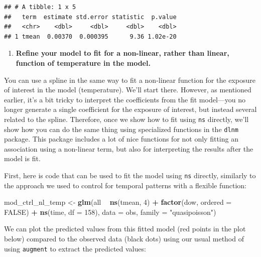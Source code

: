 \documentclass[
]{book}
\newenvironment{Shaded}{\begin{snugshade}}{\end{snugshade}}
\newcommand{\DataTypeTok}[1]{\textcolor[rgb]{0.13,0.29,0.53}{#1}}
\newcommand{\DecValTok}[1]{\textcolor[rgb]{0.00,0.00,0.81}{#1}}
\newcommand{\KeywordTok}[1]{\textcolor[rgb]{0.13,0.29,0.53}{\textbf{#1}}}
\newcommand{\NormalTok}[1]{#1}
\newcommand{\OperatorTok}[1]{\textcolor[rgb]{0.81,0.36,0.00}{\textbf{#1}}}
\newcommand{\OtherTok}[1]{\textcolor[rgb]{0.56,0.35,0.01}{#1}}
\newcommand{\StringTok}[1]{\textcolor[rgb]{0.31,0.60,0.02}{#1}}
\providecommand{\tightlist}{%
  \setlength{\itemsep}{0pt}\setlength{\parskip}{0pt}}
\begin{document}
\begin{verbatim}
## # A tibble: 1 x 5
##   term  estimate std.error statistic  p.value
##   <chr>    <dbl>     <dbl>     <dbl>    <dbl>
## 1 tmean  0.00370  0.000395      9.36 1.02e-20
\end{verbatim}

\begin{enumerate}
\def\labelenumi{\arabic{enumi}.}
\setcounter{enumi}{2}
\tightlist
\item
  \textbf{Refine your model to fit for a non-linear, rather than linear, function
  of temperature in the model.}
\end{enumerate}

You can use a spline in the same way to fit a non-linear function for the
exposure of interest in the model (temperature). We'll start there. However,
as mentioned earlier, it's a bit tricky to interpret the coefficients from the
fit model---you no longer generate a single coefficient for the exposure of
interest, but instead several related to the spline. Therefore, once we show
how to fit using \texttt{ns} directly, we'll show how you can do the same thing using
specialized functions in the \texttt{dlnm} package. This package includes a lot of
nice functions for not only fitting an association using a non-linear term,
but also for interpreting the results after the model is fit.

First, here is code that can be used to fit the model using \texttt{ns} directly,
similarly to the approach we used to control for temporal patterns with a
flexible function:

\begin{Shaded}
\begin{Highlighting}[]
\NormalTok{mod_ctrl_nl_temp <-}\StringTok{ }\KeywordTok{glm}\NormalTok{(all }\OperatorTok{~}\StringTok{ }\KeywordTok{ns}\NormalTok{(tmean, }\DecValTok{4}\NormalTok{) }\OperatorTok{+}\StringTok{ }\KeywordTok{factor}\NormalTok{(dow, }\DataTypeTok{ordered =} \OtherTok{FALSE}\NormalTok{) }\OperatorTok{+}
\StringTok{                          }\KeywordTok{ns}\NormalTok{(time, }\DataTypeTok{df =} \DecValTok{158}\NormalTok{), }
                        \DataTypeTok{data =}\NormalTok{ obs, }\DataTypeTok{family =} \StringTok{"quasipoisson"}\NormalTok{)}
\end{Highlighting}
\end{Shaded}

We can plot the predicted values from this fitted model (red points in the plot below)
compared to the observed data (black dots) using our usual method of using \texttt{augment} to
extract the predicted values:
\end{document}
